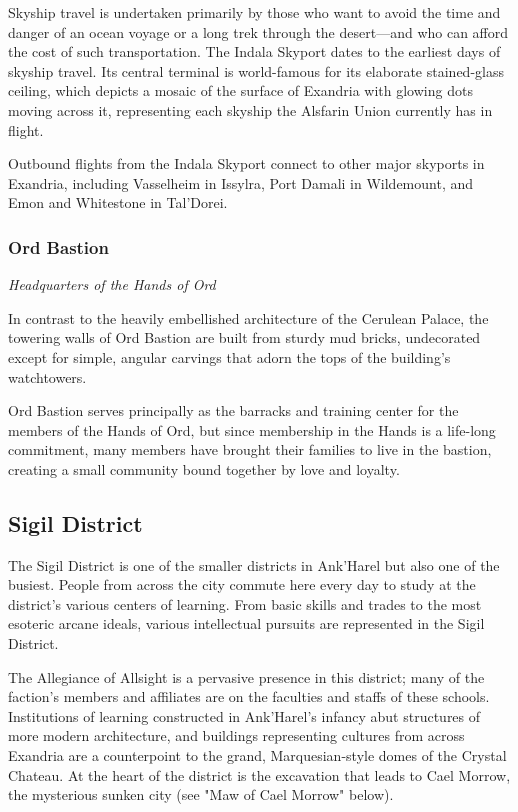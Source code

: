 \documentclass[a4paper, 11pt, bg=full, twocolumn, nooutline]{dndbook}
\begin{document}
Skyship travel is undertaken primarily by those who want to avoid the time and danger of an ocean voyage or a long trek through the desert---and who can afford the cost of such transportation. The Indala Skyport dates to the earliest days of skyship travel. Its central terminal is world-famous for its elaborate stained-glass ceiling, which depicts a mosaic of the surface of Exandria with glowing dots moving across it, representing each skyship the Alsfarin Union currently has in flight.

Outbound flights from the Indala Skyport connect to other major skyports in Exandria, including Vasselheim in Issylra, Port Damali in Wildemount, and Emon and Whitestone in Tal'Dorei.

\subsubsection{Ord Bastion}

\textit{Headquarters of the Hands of Ord}

In contrast to the heavily embellished architecture of the Cerulean Palace, the towering walls of Ord Bastion are built from sturdy mud bricks, undecorated except for simple, angular carvings that adorn the tops of the building's watchtowers.

Ord Bastion serves principally as the barracks and training center for the members of the Hands of Ord, but since membership in the Hands is a life-long commitment, many members have brought their families to live in the bastion, creating a small community bound together by love and loyalty.

\subsection{Sigil District}

The Sigil District is one of the smaller districts in Ank'Harel but also one of the busiest. People from across the city commute here every day to study at the district's various centers of learning. From basic skills and trades to the most esoteric arcane ideals, various intellectual pursuits are represented in the Sigil District.


The Allegiance of Allsight is a pervasive presence in this district; many of the faction's members and affiliates are on the faculties and staffs of these schools. Institutions of learning constructed in Ank'Harel's infancy abut structures of more modern architecture, and buildings representing cultures from across Exandria are a counterpoint to the grand, Marquesian-style domes of the Crystal Chateau. At the heart of the district is the excavation that leads to Cael Morrow, the mysterious sunken city (see "Maw of Cael Morrow" below).
\end{document}
